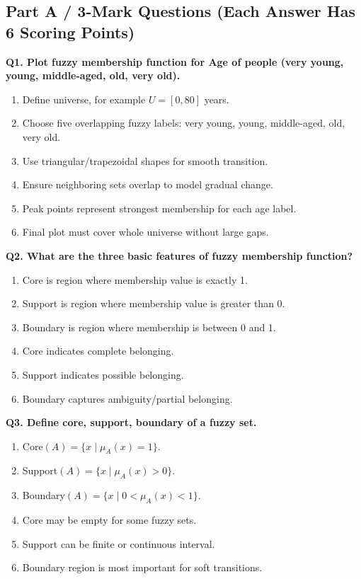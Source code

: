 \documentclass[11pt,a4paper]{article}
\begin{document}
\subsection*{Part A / 3-Mark Questions (Each Answer Has 6 Scoring Points)}

\textbf{Q1. Plot fuzzy membership function for Age of people (very young, young, middle-aged, old, very old).}
\begin{enumerate}
\item Define universe, for example $U=[0,80]$ years.
\item Choose five overlapping fuzzy labels: very young, young, middle-aged, old, very old.
\item Use triangular/trapezoidal shapes for smooth transition.
\item Ensure neighboring sets overlap to model gradual change.
\item Peak points represent strongest membership for each age label.
\item Final plot must cover whole universe without large gaps.
\end{enumerate}

\textbf{Q2. What are the three basic features of fuzzy membership function?}
\begin{enumerate}
\item Core is region where membership value is exactly 1.
\item Support is region where membership value is greater than 0.
\item Boundary is region where membership is between 0 and 1.
\item Core indicates complete belonging.
\item Support indicates possible belonging.
\item Boundary captures ambiguity/partial belonging.
\end{enumerate}

\textbf{Q3. Define core, support, boundary of a fuzzy set.}
\begin{enumerate}
\item Core$(A)=\{x\mid \mu_A(x)=1\}$.
\item Support$(A)=\{x\mid \mu_A(x)>0\}$.
\item Boundary$(A)=\{x\mid 0<\mu_A(x)<1\}$.
\item Core may be empty for some fuzzy sets.
\item Support can be finite or continuous interval.
\item Boundary region is most important for soft transitions.
\end{enumerate}
\end{document}
